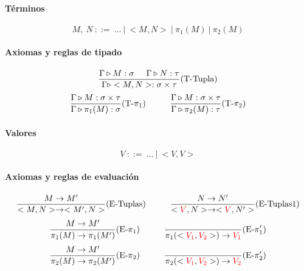 \paragraph{Términos}
$$M,~N~::=~\dots~|~<M,N>~|~\pi_1(M)~|~\pi_2(M)$$
\paragraph{Axiomas y reglas de tipado}
\begin{equation*}
	\frac{\Gamma\triangleright M : \sigma\hspace*{5mm}\Gamma\triangleright N : \tau}{\Gamma\triangleright <M,N> : \sigma\times\tau}(\text{T-Tupla})
\end{equation*}
\vspace*{5mm}
\begin{equation*}
	\frac{\Gamma\triangleright M : \sigma\times\tau}{\Gamma\triangleright \pi_1(M) : \sigma}(\text{T-}\pi_1)\hspace*{1cm}\frac{\Gamma\triangleright M : \sigma\times\tau}{\Gamma\triangleright \pi_2(M) : \tau}(\text{T-}\pi_2)
\end{equation*}

\paragraph{Valores}
$$V~::=~\dots~|~<V,V>$$

\paragraph{Axiomas y reglas de evaluación}
\begin{equation*}
	\frac{M\to M'}{<M,N>\to<M',N>}(\text{E-Tuplas})\hspace*{1cm}\frac{N\to N'}{<\color{red}V\color{black},N>\to<\color{red}V\color{black},N'>}(\text{E-Tuplas1})
\end{equation*}
\vspace*{5mm}
\begin{equation*}
	\frac{M\to M'}{\pi_1(M)\to\pi_1(M')}(\text{E-}\pi_1)\hspace*{1cm}\frac{}{\pi_1(<\color{red}V_1\color{black}, \color{red}V_2\color{black}>)\to\color{red}V_1\color{black}}(\text{E-}\pi'_1)
\end{equation*}
\vspace*{5mm}
\begin{equation*}
	\frac{M\to M'}{\pi_2(M)\to\pi_2(M')}(\text{E-}\pi_2)\hspace*{1cm}\frac{}{\pi_2(<\color{red}V_1\color{black}, \color{red}V_2\color{black}>)\to\color{red}V_2\color{black}}(\text{E-}\pi'_2)
\end{equation*}

